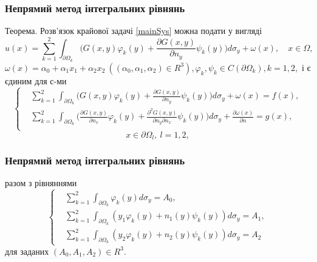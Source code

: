 \documentclass[10pt]{beamer}
\begin{document}
\begin{frame}
\frametitle{Непрямий метод інтегральних рівнянь}
Теорема. Розв'язок крайової задачі \eqref{mainSys} можна подати у вигляді
\begin{equation}
	 	u(x)=\sum_{k=1}^{2}\int_{\partial\Omega_k}\bigg(G(x,y)\varphi_k(y)+\frac{\partial G(x,y)}{\partial n_y}\psi_k(y)\bigg)d\sigma_y+\omega(x), \quad x\in \Omega,
\end{equation}
$\omega(x) = \alpha_0+\alpha_1x_1+\alpha_2x_2 \ ((\alpha_0,\alpha_1,\alpha_2)\in R^3), \varphi_k,\psi_k\in C(\partial\Omega_k), k=1,2,$
і є єдиним для с-ми
\begin{equation}
	 \left\{
	 	\begin{split}
		\label{system}
	 		&\sum_{k=1}^{2}\int_{\partial\Omega_k}\bigg(G(x,y)\varphi_k(y)+\frac{\partial G(x,y)}{\partial n_y}\psi_k(y)\bigg)d\sigma_y+\omega(x)=f(x), \\
			&\sum_{k=1}^{2}\int_{\partial\Omega_k}\bigg(\frac{\partial G(x,y)}{\partial n_x}\varphi_k(y)+\frac{\partial^2 G(x,y)}{\partial n_y\partial n_x}\psi_k(y)\bigg)d\sigma_y+\frac{\partial\omega(x)}{\partial n}=g(x), \\
		\end{split}
	\right.
	 \end{equation}
	 $$ x\in\partial\Omega_l, \ l=1,2,$$
\end{frame}

\begin{frame}
\frametitle{Непрямий метод інтегральних рівнянь}
разом з рівняннями
\begin{equation}
	 \left\{
	 	\begin{split}
		\label{system}
			&\sum_{k=1}^{2}\int_{\partial\Omega_k}\varphi_k(y)d\sigma_y=A_0, \\
			&\sum_{k=1}^{2}\int_{\partial\Omega_k}(y_1\varphi_k(y)+n_1(y)\psi_k(y))d\sigma_y=A_1, \\
			&\sum_{k=1}^{2}\int_{\partial\Omega_k}(y_2\varphi_k(y)+n_2(y)\psi_k(y))d\sigma_y=A_2
		\end{split}
	\right.
	 \end{equation}
	 для заданих $(A_0,A_1,A_2)\in R^3$.
\end{frame}
\end{document}
